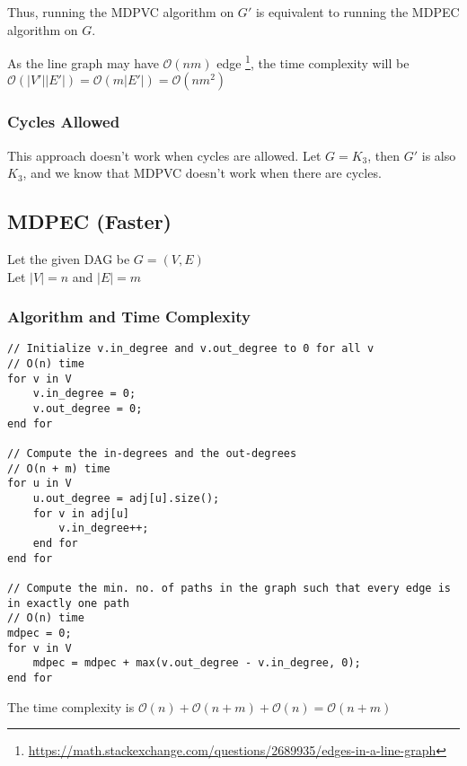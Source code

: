 \documentclass[11pt, fleqn]{article}
\begin{document}
Thus, running the MDPVC algorithm on $G'$ is equivalent to running the MDPEC algorithm on $G$. 

\medskip
As the line graph may have $\mathcal{O}(nm)$ edge \footnote{\url{https://math.stackexchange.com/questions/2689935/edges-in-a-line-graph}}, the time complexity will be $\mathcal{O}(|V'||E'|) = \mathcal{O}(m|E'|) = \mathcal{O}(nm^2)$

\subsubsection*{Cycles Allowed}
This approach doesn't work when cycles are allowed. Let $G = K_3$, then $G'$ is also $K_3$, and we know that MDPVC doesn't work when there are cycles.

\newpage
\subsection*{MDPEC (Faster)}

Let the given DAG be $G = (V, E)$\\
Let $|V| = n$ and $|E| = m$

\subsubsection*{Algorithm and Time Complexity}

\begin{verbatim}
// Initialize v.in_degree and v.out_degree to 0 for all v 
// O(n) time
for v in V
    v.in_degree = 0;
    v.out_degree = 0;
end for

// Compute the in-degrees and the out-degrees
// O(n + m) time
for u in V
    u.out_degree = adj[u].size();
    for v in adj[u]
        v.in_degree++;
    end for
end for

// Compute the min. no. of paths in the graph such that every edge is in exactly one path
// O(n) time
mdpec = 0;
for v in V
    mdpec = mdpec + max(v.out_degree - v.in_degree, 0);
end for
\end{verbatim}

The time complexity is $\mathcal{O}(n) + \mathcal{O}(n + m) + \mathcal{O}(n) = \mathcal{O}(n + m)$
\end{document}

